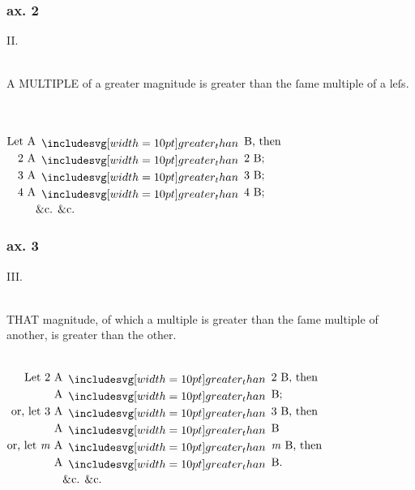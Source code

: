 \begin{center}
\begin{minipage}{0.80\textwidth}
    \hfill

    \hfill

    \subsubsection{ax. 2}
    II.\label{book5ax2}\\
    \hfill\\
    {\raggedright A \textsc{MULTIPLE} of a greater magnitude is greater than the ſame multiple of a leſs.}\\
    \hfill\\
    $\begin{aligned}
        \text{Let A} & \bgt \text{B, then} \\
        \text{2 A}   & \bgt \text{2 B;}    \\
        \text{3 A}   & \bgt \text{3 B;}    \\
        \text{4 A}   & \bgt \text{4 B;}    \\
                     & \text{\&c. \&c.}
      \end{aligned}$
  \end{minipage}%
\end{center}

\hfill

\begin{center}
  \begin{minipage}{0.80\textwidth}
    \subsubsection{ax. 3}
    \begin{center}

      III.\label{book5ax3}\\
      \hfill\\
      {\begingroup
      \raggedright T\textsc{HAT} magnitude, of which a multiple is greater than the ſame multiple of another, is greater than the other.\\
      \endgroup}

      \hfill\\
      $\begin{aligned}
          \text{Let 2 A}              & \bgt \text{2 B, then}          \\
          \text{A}                    & \bgt \text{B;}                 \\
          \text{or, let 3 A}          & \bgt \text{3 B, then}          \\
          \text{A}                    & \bgt \text{B}                  \\
          \text{or, let \textit{m} A} & \bgt \text{\textit{m} B, then} \\
          \text{A}                    & \bgt \text{B.}                 \\
                                      & \text{\&c. \&c.}
        \end{aligned}$
    \end{center}
  \end{minipage}
\end{center}

